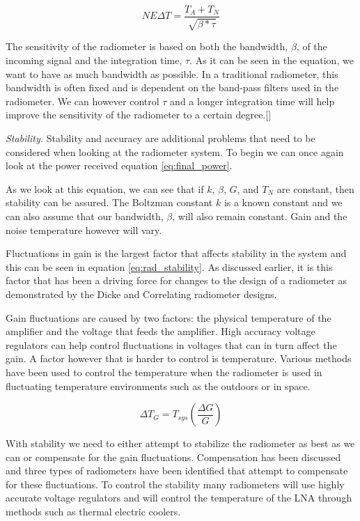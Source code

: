 \begin{equation} \label{NEAT_EQ}
NE\Delta T=\frac{T_{A}+T_{N}}{\sqrt{\beta * \tau}} 
\end{equation}

The sensitivity of the radiometer is based on both the bandwidth, $\beta$, of the incoming signal and the integration time, $\tau$.  As it can be seen in the equation, we want to have as much bandwidth as possible.  In a traditional radiometer, this bandwidth is often fixed and is dependent on the band-pass filters used in the radiometer.  We can however control $\tau$ and a longer integration time will help improve the sensitivity of the radiometer to a certain degree.[\cite{ulaby}]

\emph{Stability.}  Stability and accuracy are additional problems that need to be considered when looking at the radiometer system.  To begin we can once again look at the power received equation \ref{eq:final_power}.

As we look at this equation, we can see that if $k$, $\beta$, $G$, and $T_{N}$ are constant, then stability can be assured.  The Boltzman constant $k$ is a known constant and we can also assume that our bandwidth, $\beta$, will also remain constant.  Gain and the noise temperature however will vary.  

Fluctuations in gain is the largest factor that affects stability in the system and this can be seen in equation \ref{eq:rad_stability}.  As discussed earlier, it is this factor that has been a driving force for changes to the design of a radiometer as demonstrated by the Dicke and Correlating radiometer designs.  

Gain fluctuations are caused by two factors: the physical temperature of the amplifier and the voltage that feeds the amplifier.  High accuracy voltage regulators can help control fluctuations in voltages that can in turn affect the gain.  A factor however that is harder to control is temperature.  Various methods have been used to control the temperature when the radiometer is used in fluctuating temperature environments such as the outdoors or in space.  

\begin{equation} \label{eq:rad_stability}
\Delta T_G=T_{sys} \left(\frac{\Delta G}{G}\right)
\end{equation}

With stability we need to either attempt to stabilize the radiometer as best as we can or compensate for the gain fluctuations.  Compensation has been discussed and three types of radiometers have been identified that attempt to compensate for these fluctuations.  To control the stability many radiometers will use highly accurate voltage regulators and will control the temperature of the LNA through methods such as thermal electric coolers.

